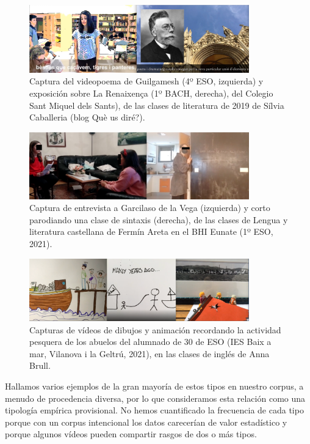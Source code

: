 \documentclass[spanish]{textolivre}
\begin{document}
\begin{figure}[htbp]
 \centering
 \includegraphics[width=0.85\textwidth]{Fig6.png}
 \caption{Captura del videopoema de Guilgamesh (4º ESO, izquierda) y exposición sobre La Renaixença (1º BACH, derecha), del Colegio Sant Miquel dels Sants), de las clases de literatura de 2019 de Sílvia Caballeria (blog Què us diré?).}
 \label{fig05}
\end{figure}

\begin{figure}[htbp]
 \centering
 \includegraphics[width=0.85\textwidth]{Fig7.png}
 \caption{Captura de entrevista a Garcilaso de la Vega (izquierda) y corto parodiando una clase de sintaxis (derecha), de las clases de Lengua y literatura castellana de Fermín Areta en el BHI Eunate (1º ESO, 2021).}
 \label{fig06}
\end{figure}

\begin{figure}[htbp]
 \centering
 \includegraphics[width=0.85\textwidth]{Fig8.png}
 \caption{Capturas de vídeos de dibujos y animación recordando la actividad pesquera de los abuelos del alumnado de 30 de ESO (IES Baix a mar, Vilanova i la Geltrú, 2021), en las clases de inglés de Anna Brull.}
 \label{fig07}
\end{figure}

Hallamos varios ejemplos de la gran mayoría de estos tipos en nuestro corpus, a menudo de procedencia diversa, por lo que consideramos esta relación como una tipología empírica provisional. No hemos cuantificado la frecuencia de cada tipo porque con un corpus intencional los datos carecerían de valor estadístico y porque algunos vídeos pueden compartir rasgos de dos o más tipos.
\end{document}
